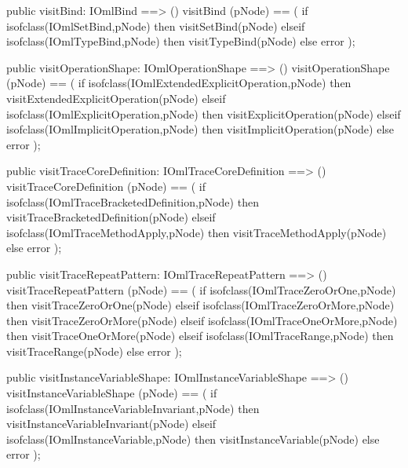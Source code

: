 \begin{vdm_al}
  public visitBind: IOmlBind ==> ()
  visitBind (pNode) ==
    ( if isofclass(IOmlSetBind,pNode) then visitSetBind(pNode)
      elseif isofclass(IOmlTypeBind,pNode) then visitTypeBind(pNode)
      else error );

  public visitOperationShape: IOmlOperationShape ==> ()
  visitOperationShape (pNode) ==
    ( if isofclass(IOmlExtendedExplicitOperation,pNode) then visitExtendedExplicitOperation(pNode)
      elseif isofclass(IOmlExplicitOperation,pNode) then visitExplicitOperation(pNode)
      elseif isofclass(IOmlImplicitOperation,pNode) then visitImplicitOperation(pNode)
      else error );

  public visitTraceCoreDefinition: IOmlTraceCoreDefinition ==> ()
  visitTraceCoreDefinition (pNode) ==
    ( if isofclass(IOmlTraceBracketedDefinition,pNode) then visitTraceBracketedDefinition(pNode)
      elseif isofclass(IOmlTraceMethodApply,pNode) then visitTraceMethodApply(pNode)
      else error );

  public visitTraceRepeatPattern: IOmlTraceRepeatPattern ==> ()
  visitTraceRepeatPattern (pNode) ==
    ( if isofclass(IOmlTraceZeroOrOne,pNode) then visitTraceZeroOrOne(pNode)
      elseif isofclass(IOmlTraceZeroOrMore,pNode) then visitTraceZeroOrMore(pNode)
      elseif isofclass(IOmlTraceOneOrMore,pNode) then visitTraceOneOrMore(pNode)
      elseif isofclass(IOmlTraceRange,pNode) then visitTraceRange(pNode)
      else error );

  public visitInstanceVariableShape: IOmlInstanceVariableShape ==> ()
  visitInstanceVariableShape (pNode) ==
    ( if isofclass(IOmlInstanceVariableInvariant,pNode) then visitInstanceVariableInvariant(pNode)
      elseif isofclass(IOmlInstanceVariable,pNode) then visitInstanceVariable(pNode)
      else error );


\end{vdm_al}
